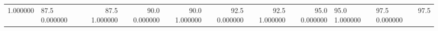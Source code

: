 \begin{table}
\begin{tabular}{llrrrrrr}
1.000000 & 87.5%
0.000000 & 87.5%
1.000000 & 90.0%
0.000000 & 90.0%
1.000000 & 92.5%
0.000000 & 92.5%
1.000000 & 95.0%
0.000000 & 95.0%
1.000000 & 97.5%
0.000000 & 97.5%
\end{tabular}
\end{table}

